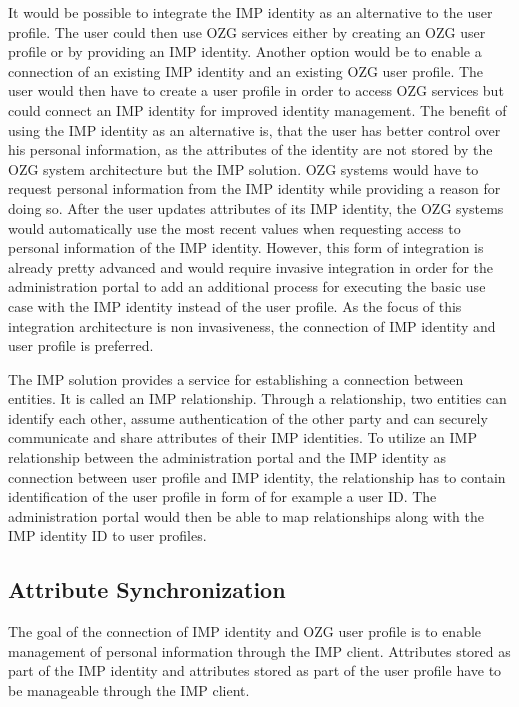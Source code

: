 It would be possible to integrate the IMP identity as an alternative to the user profile. The user could then use OZG services either by creating an OZG user profile or by providing an IMP identity. Another option would be to enable a connection of an existing IMP identity and an existing OZG user profile. The user would then have to create a user profile in order to access OZG services but could connect an IMP identity for improved identity management. The benefit of using the IMP identity as an alternative is, that the user has better control over his personal information, as the attributes of the identity are not stored by the OZG system architecture but the IMP solution. OZG systems would have to request personal information from the IMP identity while providing a reason for doing so. After the user updates attributes of its IMP identity, the OZG systems would automatically use the most recent values when requesting access to personal information of the IMP identity. However, this form of integration is already pretty advanced and would require invasive integration in order for the administration portal to add an additional process for executing the basic use case with the IMP identity instead of the user profile. As the focus of this integration architecture is non invasiveness, the connection of IMP identity and user profile is preferred.

The IMP solution provides a service for establishing a connection between entities. It is called an IMP relationship. Through a relationship, two entities can identify each other, assume authentication of the other party and can securely communicate and share attributes of their IMP identities. To utilize an IMP relationship between the administration portal and the IMP identity as connection between user profile and IMP identity, the relationship has to contain identification of the user profile in form of for example a user ID. The administration portal would then be able to map relationships along with the IMP identity ID to user profiles.

\subsection{Attribute Synchronization}

The goal of the connection of IMP identity and OZG user profile is to enable management of personal information through the IMP client. Attributes stored as part of the IMP identity and attributes stored as part of the user profile have to be manageable through the IMP client.


